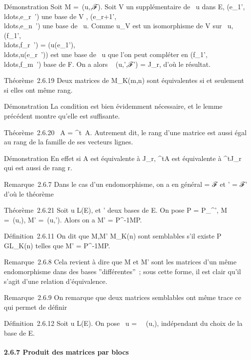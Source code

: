 \documentclass[]{article}
\begin{document}
Démonstration Soit M =\
\mathrmMat (u,,ℱ). Soit V un supplémentaire de
\mathrmKer~u dans E,
(e_1',\\ldots,e_r~')
une base de V ,
(e_r+1',\\ldots,e_n~')
une base de \mathrmKer~u.
Comme u_V  est un isomorphisme de V sur
\mathrmIm~u,
(f_1',\\ldots,f_r~')
=
(u(e_1'),\\ldots,u(e_r~'))
est une base de \mathrmIm~u
que l'on peut compléter en
(f_1',\\ldots,f_m~')
base de F. On a alors
\mathrmMat~ (u,',ℱ') =
J_r, d'où le résultat.

Théorème~2.6.19 Deux matrices de M_K(m,n) sont équivalentes si
et seulement si elles ont même rang.

Démonstration La condition est bien évidemment nécessaire, et le lemme
précédent montre qu'elle est suffisante.

Théorème~2.6.20 \mathrmrg~A
= \mathrmrg^t~A.
Autrement dit, le rang d'une matrice est aussi égal au rang de la
famille de ses vecteurs lignes.

Démonstration En effet si A est équivalente à J_r,
^tA est équivalente à ^tJ_r qui est aussi
de rang r.

Remarque~2.6.7 Dans le cas d'un endomorphisme, on a en général  = ℱ et
\mathcal{E}' = ℱ' d'où le théorème

Théorème~2.6.21 Soit u \in L(E),  et ' deux bases de E. On pose P =
P_\mathcal{E}^\mathcal{E}', M =\
\mathrmMat (u,), M' =\
\mathrmMat (u,\mathcal{E}'). Alors on a M' =
P^-1MP.

Définition~2.6.11 On dit que M,M' \in M_K(n) sont semblables s'il
existe P \in GL_K(n) telles que M' = P^-1MP.

Remarque~2.6.8 Cela revient à dire que M et M' sont les matrices d'un
même endomorphisme dans des bases ''différentes''~; sous cette forme, il
est clair qu'il s'agit d'une relation d'équivalence.

Remarque~2.6.9 On remarque que deux matrices semblables ont même trace
ce qui permet de définir

Définition~2.6.12 Soit u \in L(E). On pose
~u
=\
\mathrm{tr}\mathrmMat~
(u,), indépendant du choix de la base \mathcal{E} de E.

\paragraph{2.6.7 Produit des matrices par blocs}
\end{document}
